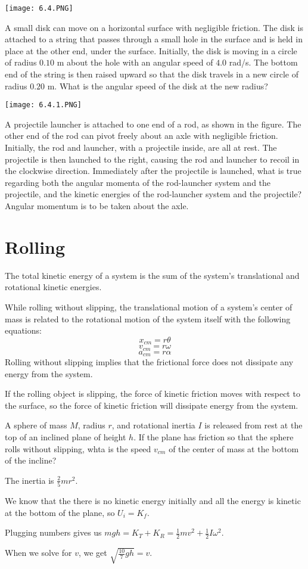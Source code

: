 \documentclass[../mech.tex]{subfiles}
\begin{document}
\ex \begin{center}
    \texttt{[image: 6.4.PNG]}
\end{center}
A small disk can move on a horizontal surface with negligible friction. The disk is attached to a string that passes through a small hole in the surface and is held in place at the other end, under the surface.
Initially, the disk is moving in a circle of radius $0.10$ m about the hole with an angular speed of $4.0$ rad/s. The bottom end of the string is then raised upward so that the disk travels in a new circle of radius $0.20$ m. What is the angular speed of the disk at the new radius?

\ex \begin{center}
    \texttt{[image: 6.4.1.PNG]}
\end{center}
A projectile launcher is attached to one end of a rod, as shown in the figure. The other end of the rod can pivot freely about an axle with negligible friction. Initially, the rod and launcher, with a projectile inside, are all at rest. The projectile is then launched to the right, 
causing the rod and launcher to recoil in the clockwise direction. Immediately after the projectile is launched, what is true regarding both the angular momenta of the rod-launcher system and the projectile, and the kinetic energies of the rod-launcher system and the projectile? Angular momentum is to be taken about the axle.

\section{Rolling}
The total kinetic energy of a system is the sum of the system's translational and rotational kinetic energies.

While rolling without slipping, the translational motion of a system's center of mass is related to the rotational motion of the system itself with the following equations:
\[ x_{cm}=r\theta \]
\[ v_{cm} = r\omega \]
\[ a_{cm}=r\alpha \]
Rolling without slipping implies that the frictional force does not dissipate any energy from the system.

If the rolling object is slipping, the force of kinetic friction moves with respect to the surface, so the force of kinetic friction will dissipate energy from the system.

\begin{example}
    A sphere of mass $M$, radius $r$, and rotational inertia $I$ is released from rest at the top of an inclined plane of height $h$. If the plane has friction so that the sphere rolls without slipping, whta is the speed $v_{cm}$ of the center of mass at the bottom of the incline?

    The inertia is $\frac{2}{5}mr^2$.

    We know that the there is no kinetic energy initially and all the energy is kinetic at the bottom of the plane, so $U_i=K_f$.

    Plugging numbers gives us $mgh=K_T+K_R=\frac{1}{2}mv^2+\frac{1}{2}I\omega^2$.

    When we solve for $v$, we get $\sqrt{\frac{10}{7}gh}=v$.
\end{example}
\end{document}
